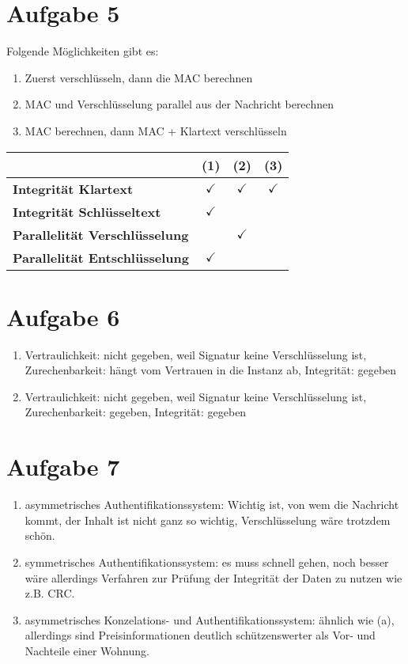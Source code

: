 \documentclass{article}
\begin{document}
	\section*{Aufgabe 5}
	Folgende Möglichkeiten gibt es:
	\begin{enumerate}[label=(\arabic*)]
		\item Zuerst verschlüsseln, dann die MAC berechnen
		\item MAC und Verschlüsselung parallel aus der Nachricht berechnen
		\item MAC berechnen, dann MAC + Klartext verschlüsseln
	\end{enumerate}
	\begin{center}
		\begin{tabular}{l|c|c|c}
			& \textbf{(1)} & \textbf{(2)} & \textbf{(3)} \\
			\hline
			\textbf{Integrität Klartext} & $\checkmark$ & $\checkmark$ & $\checkmark$ \\
			\hline
			\textbf{Integrität Schlüsseltext} & $\checkmark$ & & \\
			\hline
			\textbf{Parallelität Verschlüsselung} & & $\checkmark$ & \\
			\hline
			\textbf{Parallelität Entschlüsselung} & $\checkmark$ & & 
		\end{tabular}
	\end{center}
	
	\section*{Aufgabe 6}
	\begin{enumerate}[label=(\alph*)]
		\item Vertraulichkeit: nicht gegeben, weil Signatur keine Verschlüsselung ist, Zurechenbarkeit: hängt vom Vertrauen in die Instanz ab, Integrität: gegeben
		\item Vertraulichkeit: nicht gegeben, weil Signatur keine Verschlüsselung ist, Zurechenbarkeit: gegeben, Integrität: gegeben
	\end{enumerate}
	
	\section*{Aufgabe 7}
	\begin{enumerate}[label=(\alph*)]
		\item asymmetrisches Authentifikationssystem: Wichtig ist, von wem die Nachricht kommt, der Inhalt ist nicht ganz so wichtig, Verschlüsselung wäre trotzdem schön.
		\item symmetrisches Authentifikationssystem: es muss schnell gehen, noch besser wäre allerdings Verfahren zur Prüfung der Integrität der Daten zu nutzen wie z.B. CRC.
		\item asymmetrisches Konzelations- und Authentifikationssystem: ähnlich wie (a), allerdings sind Preisinformationen deutlich schützenswerter als Vor- und Nachteile einer Wohnung.
	\end{enumerate}
\end{document}
